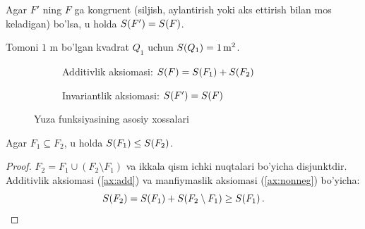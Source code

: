 \begin{aksioma}[Invariantlik]
\label{ax:inv}
Agar $F'$ ning $F$ ga kongruent (siljish, aylantirish yoki aks ettirish bilan
mos keladigan) bo'lsa, u holda $S\!\left(F'\right) = S\!\left(F\right)$.
\end{aksioma}

\begin{aksioma}[Normallashtirish]
\label{ax:norm}
Tomoni $1$ m bo'lgan kvadrat $Q_1$ uchun $S\!\left(Q_1\right) = 1\,\text{m}^2$.
\end{aksioma}

\begin{figure}[h]
\centering
\begin{subfigure}[b]{0.45\textwidth}
\centering
{}
\caption{Additivlik aksiomasi: $S\!\left(F\right)=S\!\left(F_1\right)+S\!\left(F_2\right)$}
\end{subfigure}
\hfill
\begin{subfigure}[b]{0.45\textwidth}
\centering
{}
\caption{Invariantlik aksiomasi: $S\!\left(F'\right)=S\!\left(F\right)$}
\end{subfigure}
\caption{Yuza funksiyasining asosiy xossalari}
\label{fig:axioms}
\end{figure}

\begin{lemma}[Monotonlik]
\label{lem:mono}
Agar $F_1 \subseteq F_2$, u holda $S\!\left(F_1\right) \le S\!\left(F_2\right)$.
\end{lemma}
\begin{proof}
$F_2 = F_1 \cup (F_2 \setminus F_1)$ va ikkala qism ichki nuqtalari bo'yicha
disjunktdir. Additivlik aksiomasi (\ref{ax:add}) va manfiymaslik aksiomasi
(\ref{ax:nonneg}) bo'yicha:
\[
  S\!\left(F_2\right) = S\!\left(F_1\right) + S\!\left(F_2\setminus F_1\right) \ge S\!\left(F_1\right). \qedhere
\]
\end{proof}


